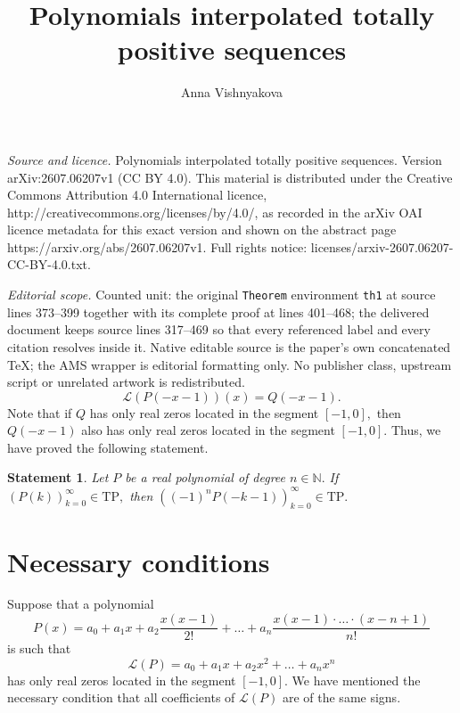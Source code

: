 \documentclass[10pt,a4paper]{amsart}
\newcounter{count}
\numberwithin{count}{section}
\newtheorem{Statement}[count]{Statement}
\begin{document}
\title[Polynomials interpolated totally positive sequences]{Polynomials interpolated totally positive sequences}
\author{Anna Vishnyakova}
\date{}
\maketitle
\noindent\emph{Source and licence.} Polynomials interpolated totally positive sequences. Version arXiv:2607.06207v1 (CC BY 4.0). This material is distributed under the Creative Commons Attribution 4.0 International licence, http://creativecommons.org/licenses/by/4.0/, as recorded in the arXiv OAI licence metadata for this exact version and shown on the abstract page https://arxiv.org/abs/2607.06207v1. Full rights notice: licenses/arxiv-2607.06207-CC-BY-4.0.txt.\par\smallskip
\noindent\textit{Editorial scope.} Counted unit: the original \texttt{Theorem} environment \texttt{th1} at source lines 373--399 together with its complete proof at lines 401--468; the delivered document keeps source lines 317--469 so that every referenced label and every citation resolves inside it. Native editable source is the paper's own concatenated TeX; the AMS wrapper is editorial formatting only. No publisher class, upstream script or unrelated artwork is redistributed.
\begin{equation}
\label{fd2}
\mathcal{L}(P(-x-1)) (x) = Q(-x-1).
\end{equation}
Note that if $Q$ has only real zeros located in the segment $[-1, 0],$ 
then $Q(-x-1)$ also  has only real zeros located in the segment $[-1, 0].$
Thus, we have proved the following statement.
 
\begin{Statement}
\label{St0}
Let $P$ be a real polynomial of degree $n\in \mathbb{N}.$  If $(P(k))_{k=0}^\infty \in \mathrm{TP},$ then $\left((-1)^n 
P(-k-1)\right)_{k=0}^\infty \in \mathrm{TP}.$
\end{Statement}

\section{Necessary conditions}

Suppose that a polynomial 
$$P(x)= a_0 + a_1 x +a_2 \frac{x(x-1)}{2!} 
+  \ldots +a_n \frac{x(x-1)\cdot \ldots \cdot (x-n+1)}{n!}$$
is such that
$$\mathcal{L}(P)
= a_0 +a_1 x +a_2 x^2 + \ldots + a_n x^n$$ 
has only real zeros located in the segment $[-1, 0].$ We have mentioned  the 
necessary condition that all  coefficients of $\mathcal{L}(P)$ are of the same signs. 
\end{document}
